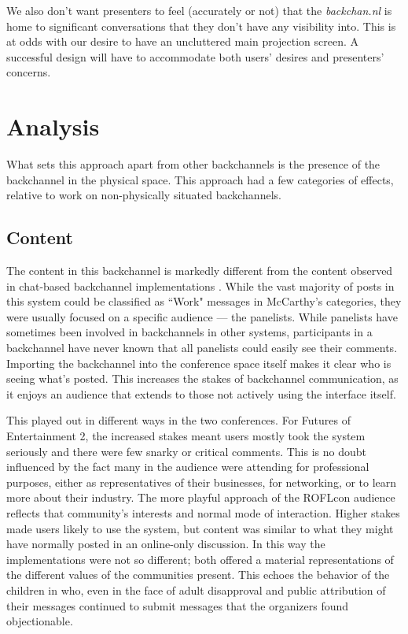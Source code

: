 We also don't want presenters to feel (accurately or not) that the \emph{backchan.nl} is home to significant conversations that they don't have any visibility into. This is at odds with our desire to have an uncluttered main projection screen. A successful design will have to accommodate both users' desires and presenters' concerns.

\section{Analysis}

What sets this approach apart from other backchannels is the presence of the backchannel in the physical space. This approach had a few categories of effects, relative to work on non-physically situated backchannels.

\subsection{Content}
The content in this backchannel is markedly different from the content observed in chat-based backchannel implementations \citep{Yardi:2006uk,Cogdill:2001fp,Golub:2005ws,Rekimoto:1998jy}. While the vast majority of posts in this system could be classified as ``Work" messages in McCarthy's categories, they were usually focused on a specific audience — the panelists. While panelists have sometimes been involved in backchannels in other systems, participants in a backchannel have never known that all panelists could easily see their comments. Importing the backchannel into the conference space itself makes it clear who is seeing what's posted. This increases the stakes of backchannel communication, as it enjoys an audience that extends to those not actively using the interface itself.

This played out in different ways in the two conferences. For Futures of Entertainment 2, the increased stakes meant users mostly took the system seriously and there were few snarky or critical comments. This is no doubt influenced by the fact many in the audience were attending for professional purposes, either as representatives of their businesses, for networking, or to learn more about their industry. The more playful approach of the ROFLcon audience reflects that community's interests and normal mode of interaction. Higher stakes made users likely to use the system, but content was similar to what they might have normally posted in an online-only discussion. In this way the implementations were not so different; both offered a material representations of the different values of the communities present. This echoes the behavior of the children in \citep{Chesnais:uh} who, even in the face of adult disapproval and public attribution of their messages continued to submit messages that the organizers found objectionable. 

